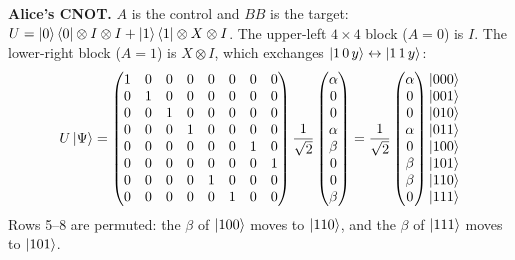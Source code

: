\documentclass[a4paper, 10pt]{article}
\begin{document}
\begin{solution}
	\noindent \textbf{Alice's CNOT.} \( A \) is the control and \( BB \) is the target:
	\( U = \ket{0}\bra{0} \otimes I \otimes I + \ket{1}\bra{1} \otimes X \otimes I \).
	The upper-left \( 4 \times 4 \) block (\( A = 0 \)) is \( I \). The lower-right block (\( A = 1 \)) is \( X \otimes I \), which exchanges \( \ket{1\,0\,y} \leftrightarrow \ket{1\,1\,y} \):
	\[
		U\ket{\Psi}
		= \begin{pmatrix}
			1 & 0 & 0 & 0 & 0 & 0 & 0 & 0 \\
			0 & 1 & 0 & 0 & 0 & 0 & 0 & 0 \\
			0 & 0 & 1 & 0 & 0 & 0 & 0 & 0 \\
			0 & 0 & 0 & 1 & 0 & 0 & 0 & 0 \\
			0 & 0 & 0 & 0 & 0 & 0 & 1 & 0 \\
			0 & 0 & 0 & 0 & 0 & 0 & 0 & 1 \\
			0 & 0 & 0 & 0 & 1 & 0 & 0 & 0 \\
			0 & 0 & 0 & 0 & 0 & 1 & 0 & 0
		\end{pmatrix}
		\frac{1}{\sqrt{2}}\begin{pmatrix} \alpha \\ 0 \\ 0 \\ \alpha \\ \beta \\ 0 \\ 0 \\ \beta \end{pmatrix}
		= \frac{1}{\sqrt{2}}\begin{pmatrix} \alpha \\ 0 \\ 0 \\ \alpha \\ 0 \\ \beta \\ \beta \\ 0 \end{pmatrix}
		\begin{matrix} \ket{000} \\ \ket{001} \\ \ket{010} \\ \ket{011} \\ \ket{100} \\ \ket{101} \\ \ket{110} \\ \ket{111} \end{matrix}
	\]
	Rows 5--8 are permuted: the \( \beta \) of \( \ket{100} \) moves to \( \ket{110} \), and the \( \beta \) of \( \ket{111} \) moves to \( \ket{101} \).


\end{solution}
\end{document}
